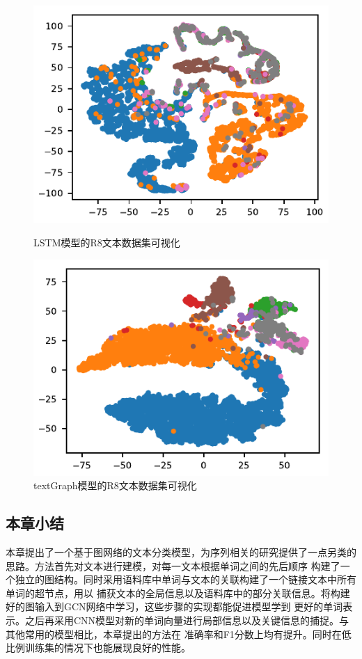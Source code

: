 \begin{figure}[htb]
    \begin{minipage}[t]{0.5\linewidth}
    \centering
    \includegraphics[width=1\textwidth]{pic/R8-RNN.pdf}
    \caption{LSTM模型的R8文本数据集可视化}
    \label{r8_embeding}
    \end{minipage}
    \quad
    \begin{minipage}[t]{0.5\linewidth}
    \centering
    \includegraphics[width=1\textwidth]{pic/R8-TextGraph.pdf}
    \caption{textGraph模型的R8文本数据集可视化}
    \label{R8_textGraph}
    \end{minipage}
\end{figure}

\subsection{本章小结}
本章提出了一个基于图网络的文本分类模型，为序列相关的研究提供了一点另类的思路。方法首先对文本进行建模，对每一文本根据单词之间的先后顺序
构建了一个独立的图结构。同时采用语料库中单词与文本的关联构建了一个链接文本中所有单词的超节点，用以
捕获文本的全局信息以及语料库中的部分关联信息。将构建好的图输入到GCN网络中学习，这些步骤的实现都能促进模型学到
更好的单词表示。之后再采用CNN模型对新的单词向量进行局部信息以及关键信息的捕捉。与其他常用的模型相比，本章提出的方法在
准确率和F1分数上均有提升。同时在低比例训练集的情况下也能展现良好的性能。